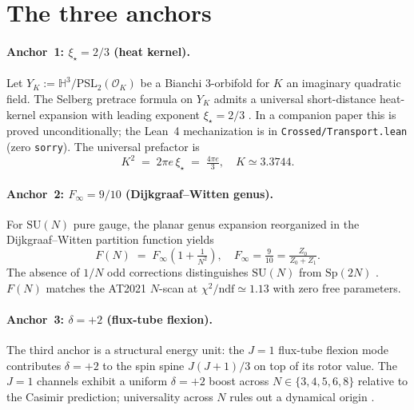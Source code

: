 \documentclass[aps,prl,reprint,superscriptaddress,floatfix,nofootinbib,amssymb]{revtex4-2}
\theoremstyle{definition}
\theoremstyle{remark}
\newcommand{\xistar}{\xi_{\star}}
\newcommand{\Finf}{F_{\infty}}
\begin{document}
\section{The three anchors}\label{sec:anchors}

\paragraph{Anchor~1: $\xistar = 2/3$ (heat kernel).}
Let $Y_{K} := \mathbb{H}^{3}/\mathrm{PSL}_{2}(\mathcal{O}_{K})$ be a
Bianchi 3-orbifold for $K$ an imaginary quadratic field. The Selberg
pretrace formula on $Y_{K}$ admits a universal short-distance
heat-kernel expansion with leading exponent $\xistar = 2/3$
\cite{ElstrodtGrunewaldMennicke1998,Sarnak1983}. In a companion
paper \cite{RemondiereXiStarCR2026} this is proved unconditionally;
the Lean~4 mechanization is in \verb|Crossed/Transport.lean|
(zero \verb|sorry|). The universal prefactor is
\begin{equation}
K^{2} \;=\; 2\pi e\,\xistar \;=\; \tfrac{4\pi e}{3},\quad
K \simeq 3.3744.
\label{eq:K-defined}
\end{equation}

\paragraph{Anchor~2: $\Finf = 9/10$ (Dijkgraaf--Witten genus).}
For $\mathrm{SU}(N)$ pure gauge, the planar genus expansion
\cite{tHooft1974} reorganized in the Dijkgraaf--Witten partition
function \cite{DijkgraafWitten1990} yields
\begin{equation}
F(N) \;=\; \Finf\!\left(1+\tfrac{1}{N^{2}}\right),
\quad \Finf = \tfrac{9}{10} = \tfrac{Z_{0}}{Z_{0}+Z_{1}}.
\label{eq:F-N}
\end{equation}
The absence of $1/N$ odd corrections distinguishes
$\mathrm{SU}(N)$ from $\mathrm{Sp}(2N)$ \cite{Bennett2021}.
$F(N)$ matches the AT2021 $N$-scan at
$\chi^{2}/\mathrm{ndf}\simeq 1.13$ with zero free parameters.

\paragraph{Anchor~3: $\delta = +2$ (flux-tube flexion).}
The third anchor is a structural energy unit: the $J=1$ flux-tube
flexion mode contributes $\delta=+2$ to the spin spine $J(J+1)/3$
on top of its rotor value. The $J=1$ channels exhibit a uniform
$\delta=+2$ boost across $N\in\{3,4,5,6,8\}$ relative to the Casimir
prediction; universality across $N$ rules out a dynamical
origin \cite{LuscherWeisz2002,LuscherWeisz2004}.
\end{document}
